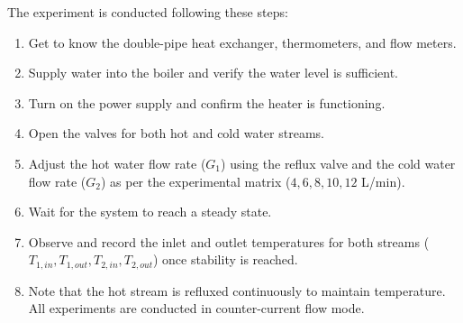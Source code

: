 The experiment is conducted following these steps:
\begin{enumerate}
    \item Get to know the double-pipe heat exchanger, thermometers, and flow meters.
    \item Supply water into the boiler and verify the water level is sufficient.
    \item Turn on the power supply and confirm the heater is functioning.
    \item Open the valves for both hot and cold water streams.
    \item Adjust the hot water flow rate ($G_1$) using the reflux valve and the cold water flow rate ($G_2$) as per the experimental matrix ($4, 6, 8, 10, 12$ L/min).
    \item Wait for the system to reach a steady state.
    \item Observe and record the inlet and outlet temperatures for both streams ($T_{1,in}, T_{1,out}, T_{2,in}, T_{2,out}$) once stability is reached.
    \item Note that the hot stream is refluxed continuously to maintain temperature. All experiments are conducted in counter-current flow mode.
\end{enumerate}
